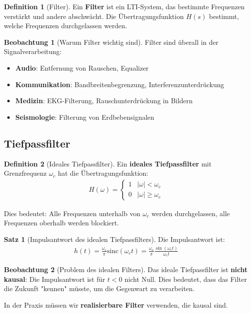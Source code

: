 ﻿\documentclass[a4paper,12pt]{report}
\theoremstyle{definition}
\newtheorem{definition}{Definition}
\newtheorem{satz}{Satz}
\newtheorem{beobachtung}{Beobachtung}
\begin{document}
	\begin{definition}[Filter]
		Ein \textbf{Filter} ist ein LTI-System, das bestimmte Frequenzen verstärkt und andere abschwächt. Die Übertragungsfunktion $H(s)$ bestimmt, welche Frequenzen durchgelassen werden.
	\end{definition}
	
	\begin{beobachtung}[Warum Filter wichtig sind]
		Filter sind überall in der Signalverarbeitung:
		\begin{itemize}
			\item[-] \textbf{Audio}: Entfernung von Rauschen, Equalizer
			\item[-] \textbf{Kommunikation}: Bandbreitenbegrenzung, Interferenzunterdrückung
			\item[-] \textbf{Medizin}: EKG-Filterung, Rauschunterdrückung in Bildern
			\item[-] \textbf{Seismologie}: Filterung von Erdbebensignalen
		\end{itemize}
	\end{beobachtung}
	
	\subsection{Tiefpassfilter}
	
	\begin{definition}[Ideales Tiefpassfilter]
		Ein \textbf{ideales Tiefpassfilter} mit Grenzfrequenz $\omega_c$ hat die Übertragungsfunktion:
		\begin{align}
			H(\omega) = \begin{cases} 1 & |\omega| < \omega_c \\ 0 & |\omega| \geq \omega_c \end{cases}
		\end{align}
		
		Dies bedeutet: Alle Frequenzen unterhalb von $\omega_c$ werden durchgelassen, alle Frequenzen oberhalb werden blockiert.
	\end{definition}
	
	\begin{satz}[Impulsantwort des idealen Tiefpassfilters]
		Die Impulsantwort ist:
		\begin{align}
			h(t) = \frac{\omega_c}{\pi} \text{sinc}(\omega_c t) = \frac{\omega_c}{\pi} \frac{\sin(\omega_c t)}{\omega_c t}
		\end{align}
	\end{satz}
	
	\begin{beobachtung}[Problem des idealen Filters]
		Das ideale Tiefpassfilter ist \textbf{nicht kausal}: Die Impulsantwort ist für $t < 0$ nicht Null. Dies bedeutet, dass das Filter die Zukunft "kennen" müsste, um die Gegenwart zu verarbeiten.
		
		In der Praxis müssen wir \textbf{realisierbare Filter} verwenden, die kausal sind.
	\end{beobachtung}
	
\end{document}
